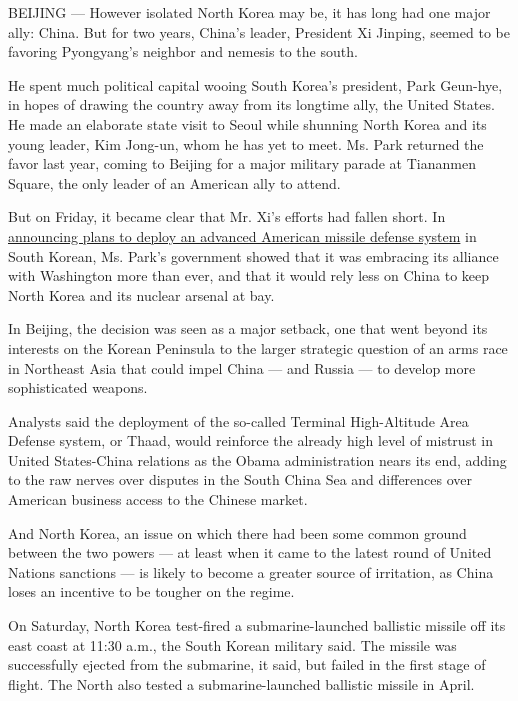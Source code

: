 BEIJING --- However isolated North Korea may be, it has long had one
major ally: China. But for two years, China's leader, President Xi
Jinping, seemed to be favoring Pyongyang's neighbor and nemesis to the
south.

He spent much political capital wooing South Korea's president, Park
Geun-hye, in hopes of drawing the country away from its longtime ally,
the United States. He made an elaborate state visit to Seoul while
shunning North Korea and its young leader, Kim Jong-un, whom he has yet
to meet. Ms. Park returned the favor last year, coming to Beijing for a
major military parade at Tiananmen Square, the only leader of an
American ally to attend.

But on Friday, it became clear that Mr. Xi's efforts had fallen short.
In
\href{http://www.nytimes.com/2016/07/08/world/asia/south-korea-and-us-agree-to-deploy-missile-defense-system.html}{announcing
plans to deploy an advanced American missile defense system} in South
Korean, Ms. Park's government showed that it was embracing its alliance
with Washington more than ever, and that it would rely less on China to
keep North Korea and its nuclear arsenal at bay.

In Beijing, the decision was seen as a major setback, one that went
beyond its interests on the Korean Peninsula to the larger strategic
question of an arms race in Northeast Asia that could impel China ---
and Russia --- to develop more sophisticated weapons.

Analysts said the deployment of the so-called Terminal High-Altitude
Area Defense system, or Thaad, would reinforce the already high level of
mistrust in United States-China relations as the Obama administration
nears its end, adding to the raw nerves over disputes in the South China
Sea and differences over American business access to the Chinese market.

And North Korea, an issue on which there had been some common ground
between the two powers --- at least when it came to the latest round of
United Nations sanctions --- is likely to become a greater source of
irritation, as China loses an incentive to be tougher on the regime.

On Saturday, North Korea test-fired a submarine-launched ballistic
missile off its east coast at 11:30 a.m., the South Korean military
said. The missile was successfully ejected from the submarine, it said,
but failed in the first stage of flight. The North also tested a
submarine-launched ballistic missile in April.

